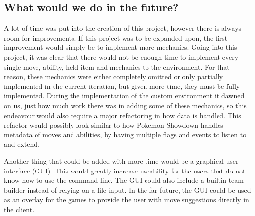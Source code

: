 \subsection{What would we do in the future?}
A lot of time was put into the creation of this project, however there is always room for improvements. If this project was to
be expanded upon, the first improvement would simply be to implement more mechanics. Going into this project, it was clear
that there would not be enough time to implement every single move, ability, held item and mechanics to the environment. 
For that reason, these mechanics were either completely omitted or only partially implemented in the current iteration, but
given more time, they must be fully implemented. During the implementation of the custom environment it dawned on us, just 
how much work there was in adding some of these mechanics, so this endeavour would also require a major refactoring in how
data is handled. This refactor would possibly look similar to how Pokemon Showdown \cite{PokemonShowdownSource} handles 
metadata of moves and abilities, by having multiple flags and events to listen to and extend.

Another thing that could be added with more time would be a graphical user interface (GUI). This would greatly increase 
useability for the users that do not know how to use the command line. The GUI could also include a builtin team builder 
instead of relying on a file input. In the far future, the GUI could be used as an overlay for the games to provide the 
user with move suggestions directly in the client.
